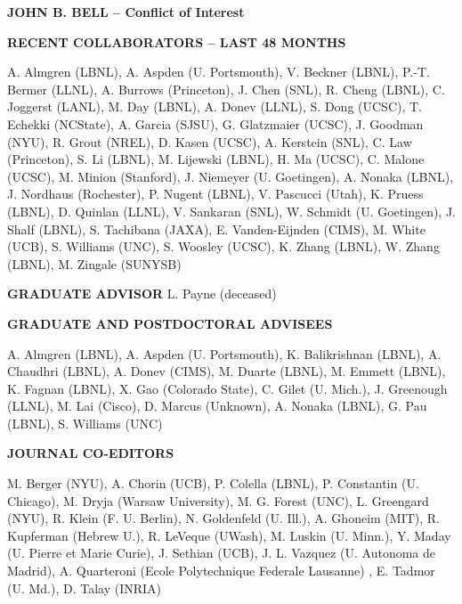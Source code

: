 \documentclass[11pt]{article}
\begin{document}
\begin{center}
{\large{\bf JOHN B. BELL -- Conflict of Interest}} \\
\end{center}

\vspace{.2 true in}
{\bf RECENT COLLABORATORS -- LAST 48 MONTHS}

\vspace{.075 true in}
A. Almgren (LBNL), A. Aspden (U. Portsmouth), V. Beckner (LBNL), P.-T. Bermer (LLNL),
A. Burrows (Princeton),
J. Chen (SNL), 
R. Cheng (LBNL), C. Joggerst (LANL), 
M. Day (LBNL), A. Donev (LLNL), S. Dong (UCSC), T. Echekki (NCState),
A. Garcia (SJSU), G. Glatzmaier (UCSC), J. Goodman (NYU), R. Grout (NREL),
D. Kasen (UCSC), A. Kerstein (SNL), C. Law (Princeton), S. Li (LBNL), M. Lijewski (LBNL),
H. Ma (UCSC), C. Malone (UCSC), M. Minion (Stanford), J. Niemeyer (U. Goetingen), 
A. Nonaka (LBNL), J. Nordhaus (Rochester), P. Nugent (LBNL), V. Pascucci (Utah), K. Pruess (LBNL),
D. Quinlan (LLNL),
V. Sankaran (SNL), W. Schmidt (U. Goetingen),
J. Shalf (LBNL),
S. Tachibana (JAXA), E. Vanden-Eijnden (CIMS),  M. White (UCB),
S. Williams (UNC), S. Woosley (UCSC), K. Zhang (LBNL), W. Zhang (LBNL), M. Zingale (SUNYSB)

\vspace{.2 true in}
{\bf GRADUATE ADVISOR}
L. Payne (deceased)

\vspace{.2 true in}
{\bf GRADUATE AND POSTDOCTORAL ADVISEES}

\vspace{.075 true in}
A. Almgren (LBNL), A. Aspden (U. Portsmouth), K. Balikrishnan (LBNL), A. Chaudhri (LBNL),
A. Donev (CIMS), M. Duarte (LBNL), M. Emmett (LBNL), K. Fagnan (LBNL), X. Gao (Colorado State),
C. Gilet (U. Mich.),
J. Greenough (LLNL), M. Lai (Cisco), D. Marcus (Unknown),
A. Nonaka (LBNL), G. Pau (LBNL), S. Williams (UNC)

\vspace{.2 true in}
{\bf JOURNAL CO-EDITORS}

\vspace{.075 true in}
M. Berger (NYU), A. Chorin (UCB), P. Colella (LBNL), P. Constantin (U. Chicago),
M. Dryja (Warsaw University),
M. G. Forest (UNC), L. Greengard (NYU),
R. Klein (F. U. Berlin), N. Goldenfeld (U. Ill.), A. Ghoneim (MIT), R. Kupferman (Hebrew U.), R. LeVeque (UWash),
M. Luskin (U. Minn.), Y. Maday (U. Pierre et Marie Curie), J. Sethian (UCB), J. L. Vazquez (U. Autonoma de Madrid),
A. Quarteroni (Ecole Polytechnique Federale Lausanne) , E. Tadmor (U. Md.), D. Talay (INRIA)
\end{document}
